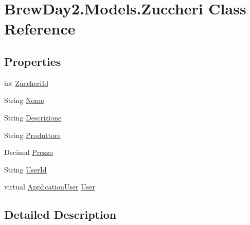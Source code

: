 \hypertarget{class_brew_day2_1_1_models_1_1_zuccheri}{}\section{Brew\+Day2.\+Models.\+Zuccheri Class Reference}
\label{class_brew_day2_1_1_models_1_1_zuccheri}
\subsection*{Properties}
\begin{DoxyCompactItemize}
\item 
int \mbox{\hyperlink{class_brew_day2_1_1_models_1_1_zuccheri_aedc113d2f6e282e86012199d39bb44b9}{Zuccheri\+Id}}
\item 
String \mbox{\hyperlink{class_brew_day2_1_1_models_1_1_zuccheri_a82b1b1ba0672afc47d7c6d5419ad8aee}{Nome}}
\item 
String \mbox{\hyperlink{class_brew_day2_1_1_models_1_1_zuccheri_a5546d483b2d7cc5540dc5657e0986319}{Descrizione}}
\item 
String \mbox{\hyperlink{class_brew_day2_1_1_models_1_1_zuccheri_aa7c89bbc6b9db36bd9d20b2748de730e}{Produttore}}
\item 
Decimal \mbox{\hyperlink{class_brew_day2_1_1_models_1_1_zuccheri_a8f8c2d5e5c187fb5a8e4ead82908df7f}{Prezzo}}
\item 
String \mbox{\hyperlink{class_brew_day2_1_1_models_1_1_zuccheri_a8a49ec9c0f1a79e0cb602936be197cf9}{User\+Id}}
\item 
virtual \mbox{\hyperlink{class_brew_day2_1_1_models_1_1_application_user}{Application\+User}} \mbox{\hyperlink{class_brew_day2_1_1_models_1_1_zuccheri_ab48c4e8fe920a624f4eab204bc598a7e}{User}}
\end{DoxyCompactItemize}


\subsection{Detailed Description}


